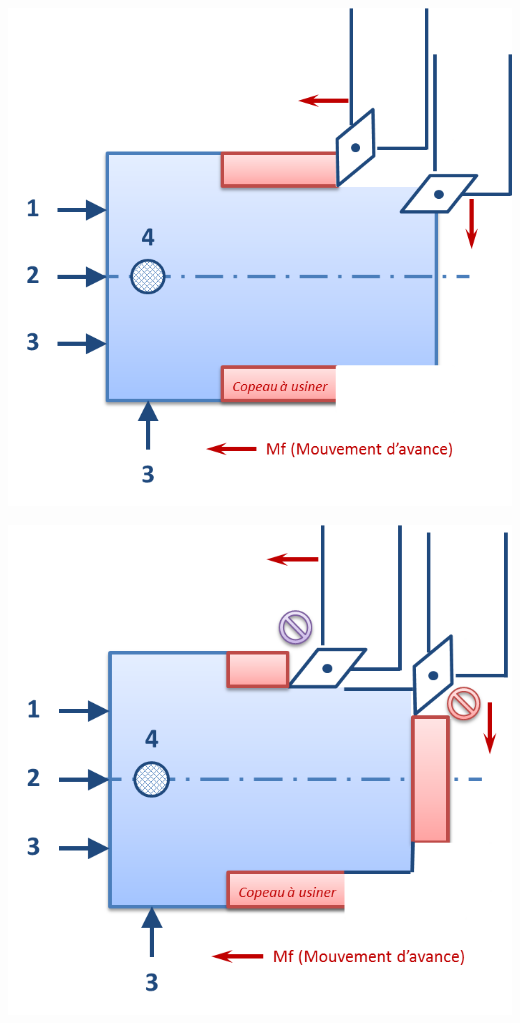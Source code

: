 \documentclass[11pt,oneside]{article}
\begin{document}
\begin{minipage}[c]{.45\linewidth}
\begin{center}
\includegraphics[width=.9\textwidth]{png/pp_geometrie.png}
\end{center}
\end{minipage} \hfill
\begin{minipage}[c]{.45\linewidth}
\begin{center}
\includegraphics[width=.9\textwidth]{png/pp_geometrie_2.png}
\end{center}
\end{minipage} 
\end{document}
